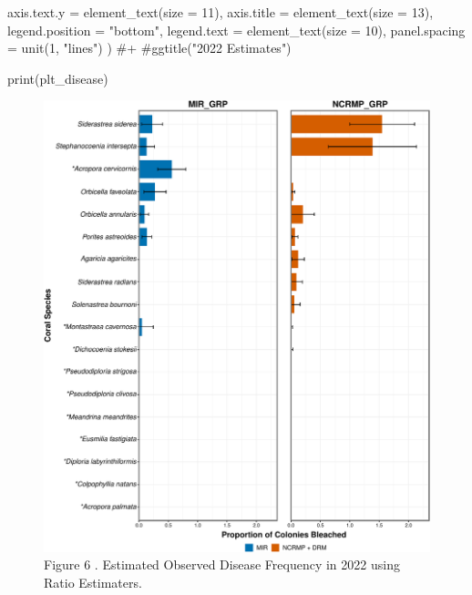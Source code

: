 \documentclass[
]{article}
\newenvironment{Shaded}{\begin{snugshade}}{\end{snugshade}}
\newcommand{\AttributeTok}[1]{\textcolor[rgb]{0.40,0.45,0.13}{#1}}
\newcommand{\CommentTok}[1]{\textcolor[rgb]{0.37,0.37,0.37}{#1}}
\newcommand{\DecValTok}[1]{\textcolor[rgb]{0.68,0.00,0.00}{#1}}
\newcommand{\FunctionTok}[1]{\textcolor[rgb]{0.28,0.35,0.67}{#1}}
\newcommand{\NormalTok}[1]{\textcolor[rgb]{0.00,0.23,0.31}{#1}}
\newcommand{\StringTok}[1]{\textcolor[rgb]{0.13,0.47,0.30}{#1}}
\begin{document}
\begin{Shaded}
\begin{Highlighting}[]
          \AttributeTok{axis.text.y =} \FunctionTok{element\_text}\NormalTok{(}\AttributeTok{size =} \DecValTok{11}\NormalTok{),}
          \AttributeTok{axis.title =} \FunctionTok{element\_text}\NormalTok{(}\AttributeTok{size =} \DecValTok{13}\NormalTok{),}
          \AttributeTok{legend.position =} \StringTok{"bottom"}\NormalTok{,}
          \AttributeTok{legend.text =} \FunctionTok{element\_text}\NormalTok{(}\AttributeTok{size =} \DecValTok{10}\NormalTok{),}
          \AttributeTok{panel.spacing =} \FunctionTok{unit}\NormalTok{(}\DecValTok{1}\NormalTok{, }\StringTok{"lines"}\NormalTok{)}
\NormalTok{        ) }\CommentTok{\#+}
  \CommentTok{\#ggtitle("2022 Estimates")}


\FunctionTok{print}\NormalTok{(plt\_disease)}
\end{Highlighting}
\end{Shaded}

\begin{figure}[H]

{\centering \includegraphics{MIR_quarto_files/figure-pdf/disease 2024-1.pdf}

}

\caption{Figure 6 . Estimated Observed Disease Frequency in 2022 using
Ratio Estimaters.}

\end{figure}
\end{document}
